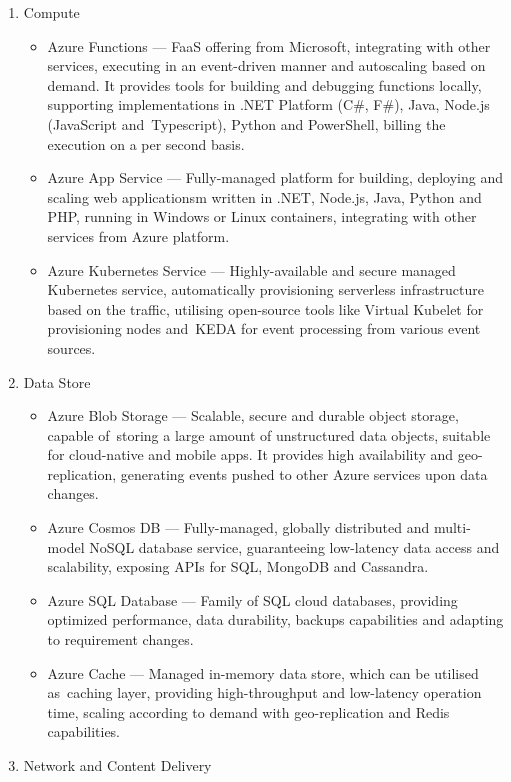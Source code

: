 \begin{enumerate}
   \item Compute
   \begin{itemize}
       \item Azure Functions --- FaaS offering from Microsoft, integrating with other services, executing in an event-driven manner and autoscaling based on demand. It provides tools for building and debugging functions locally, supporting implementations in .NET Platform (C\#, F\#), Java, Node.js (JavaScript and~Typescript), Python and PowerShell, billing the execution on a per second basis.
       \item Azure App Service --- Fully-managed platform for building, deploying and scaling web applicationsm written in .NET, Node.js, Java, Python and PHP, running in Windows or Linux containers, integrating with other services from Azure platform.
       \item Azure Kubernetes Service --- Highly-available and secure managed Kubernetes service, automatically provisioning serverless infrastructure based on the traffic, utilising open-source tools like Virtual Kubelet for provisioning nodes and~KEDA for event processing from various event sources.
   \end{itemize}
   \item Data Store
   \begin{itemize}
       \item Azure Blob Storage --- Scalable, secure and durable object storage, capable of~storing a large amount of unstructured data objects, suitable for cloud-native and mobile apps. It provides high availability and geo-replication, generating events pushed to other Azure services upon data changes.
       \item Azure Cosmos DB --- Fully-managed, globally distributed and multi-model NoSQL database service, guaranteeing low-latency data access and scalability, exposing APIs for SQL, MongoDB and Cassandra.
       \item Azure SQL Database --- Family of SQL cloud databases, providing optimized performance, data durability, backups capabilities and adapting to requirement changes.
       \item Azure Cache --- Managed in-memory data store, which can be utilised as~caching layer, providing high-throughput and low-latency operation time, scaling according to demand with geo-replication and Redis capabilities.
   \end{itemize}
   \item Network and Content Delivery

\end{enumerate}
